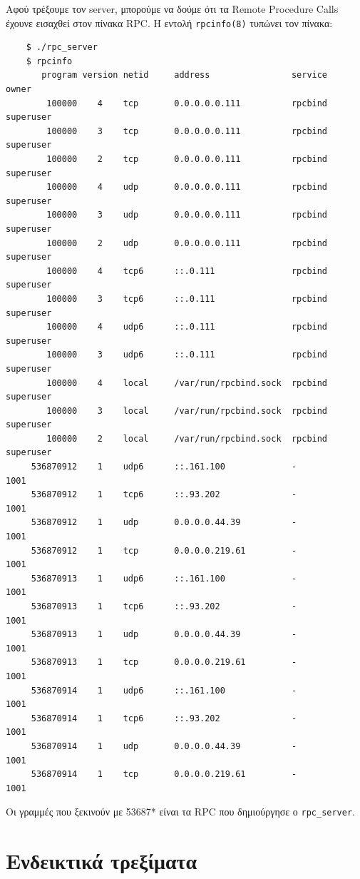 \documentclass{article}
\begin{document}
Αφού τρέξουμε τον server, μπορούμε να δούμε ότι τα Remote Procedure Calls
έχουνε εισαχθεί στον πίνακα RPC. Η εντολή \lstinline{rpcinfo(8)} τυπώνει
τον πίνακα:

\begin{lstlisting}
	$ ./rpc_server
	$ rpcinfo
	   program version netid     address                service    owner
	    100000    4    tcp       0.0.0.0.0.111          rpcbind    superuser
	    100000    3    tcp       0.0.0.0.0.111          rpcbind    superuser
	    100000    2    tcp       0.0.0.0.0.111          rpcbind    superuser
	    100000    4    udp       0.0.0.0.0.111          rpcbind    superuser
	    100000    3    udp       0.0.0.0.0.111          rpcbind    superuser
	    100000    2    udp       0.0.0.0.0.111          rpcbind    superuser
	    100000    4    tcp6      ::.0.111               rpcbind    superuser
	    100000    3    tcp6      ::.0.111               rpcbind    superuser
	    100000    4    udp6      ::.0.111               rpcbind    superuser
	    100000    3    udp6      ::.0.111               rpcbind    superuser
	    100000    4    local     /var/run/rpcbind.sock  rpcbind    superuser
	    100000    3    local     /var/run/rpcbind.sock  rpcbind    superuser
	    100000    2    local     /var/run/rpcbind.sock  rpcbind    superuser
	 536870912    1    udp6      ::.161.100             -          1001
	 536870912    1    tcp6      ::.93.202              -          1001
	 536870912    1    udp       0.0.0.0.44.39          -          1001
	 536870912    1    tcp       0.0.0.0.219.61         -          1001
	 536870913    1    udp6      ::.161.100             -          1001
	 536870913    1    tcp6      ::.93.202              -          1001
	 536870913    1    udp       0.0.0.0.44.39          -          1001
	 536870913    1    tcp       0.0.0.0.219.61         -          1001
	 536870914    1    udp6      ::.161.100             -          1001
	 536870914    1    tcp6      ::.93.202              -          1001
	 536870914    1    udp       0.0.0.0.44.39          -          1001
	 536870914    1    tcp       0.0.0.0.219.61         -          1001
\end{lstlisting}

Οι γραμμές που ξεκινούν με 53687* είναι τα RPC που δημιούργησε ο
\lstinline{rpc_server}.

\section{Ενδεικτικά τρεξίματα}
\end{document}
